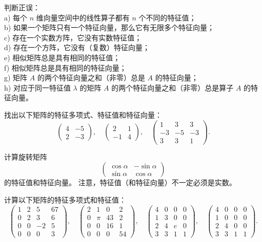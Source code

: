 \begin{problemset}
\item \label{ex:04-01-01} 判断正误：
\\
a) 每个 $n$ 维向量空间中的线性算子都有 $n$ 个不同的特征值；
\\
b) 如果一个矩阵只有一个特征向量，那么它有无限多个特征向量；
\\
c) 存在一个实数方阵，它没有实数特征值；
\\
d) 存在一个方阵，它没有（复数）特征向量；
\\
e) 相似矩阵总是具有相同的特征值；
\\
f) 相似矩阵总是具有相同的特征向量；
\\
g) 矩阵 $A$ 的两个特征向量之和（非零）总是 $A$ 的特征向量；
\\
h) 对应于同一特征值 $\lambda$ 的矩阵 $A$ 的两个特征向量之和（非零）总是算子 $A$ 的特征向量。
\item \label{ex:04-01-02} 找出以下矩阵的特征多项式、特征值和特征向量：
$$\begin{pmatrix} 4 & -5 \\ 2 & -3 \end{pmatrix},\quad \begin{pmatrix} 2 & 1 \\ -1 & 4 \end{pmatrix},\quad \begin{pmatrix} 1 & 3 & 3 \\ -3 & -5 & -3 \\ 3 & 3 & 1 \end{pmatrix}.$$
\item \label{ex:04-01-03} 计算旋转矩阵
$$\begin{pmatrix} \cos \alpha & -\sin \alpha \\ \sin \alpha & \cos \alpha \end{pmatrix}$$
的特征值和特征向量。
注意，特征值（和特征向量）不一定必须是实数。
\item \label{ex:04-01-04} 计算以下矩阵的特征多项式和特征值：
$$\begin{pmatrix} 1 & 2 & 5 & 67 \\ 0 & 2 & 3 & 6 \\ 0 & 0 & -2 & 5 \\ 0 & 0 & 0 & 3 \end{pmatrix},\quad \begin{pmatrix} 2 & 1 & 0 & 2 \\ 0 & \pi & 43 & 2 \\ 0 & 0 & 16 & 1 \\ 0 & 0 & 0 & 54 \end{pmatrix},\quad \begin{pmatrix} 4 & 0 & 0 & 0 \\ 1 & 3 & 0 & 0 \\ 2 & 4 & e & 0 \\ 3 & 3 & 1 & 1 \end{pmatrix},\quad \begin{pmatrix} 4 & 0 & 0 & 0 \\ 1 & 0 & 0 & 0 \\ 2 & 4 & 0 & 0 \\ 3 & 3 & 1 & 1 \end{pmatrix}.$$

\end{problemset}
